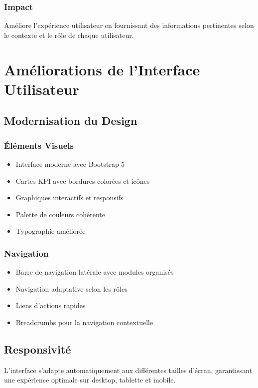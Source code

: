 \documentclass[12pt,a4paper]{article}
\begin{document}
\subsubsection{Impact}
Améliore l'expérience utilisateur en fournissant des informations pertinentes selon le contexte et le rôle de chaque utilisateur.

\section{Améliorations de l'Interface Utilisateur}

\subsection{Modernisation du Design}

\subsubsection{Éléments Visuels}
\begin{itemize}
    \item Interface moderne avec Bootstrap 5
    \item Cartes KPI avec bordures colorées et icônes
    \item Graphiques interactifs et responsifs
    \item Palette de couleurs cohérente
    \item Typographie améliorée
\end{itemize}

\subsubsection{Navigation}
\begin{itemize}
    \item Barre de navigation latérale avec modules organisés
    \item Navigation adaptative selon les rôles
    \item Liens d'actions rapides
    \item Breadcrumbs pour la navigation contextuelle
\end{itemize}

\subsection{Responsivité}
L'interface s'adapte automatiquement aux différentes tailles d'écran, garantissant une expérience optimale sur desktop, tablette et mobile.
\end{document}
